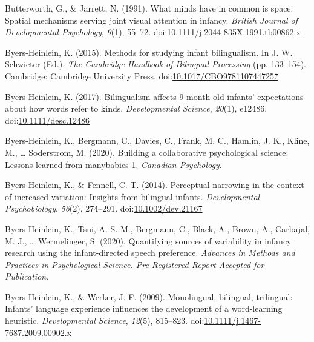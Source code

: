 \documentclass[,man,floatsintext]{apa6}
\begin{document}
\leavevmode\hypertarget{ref-Butterworth_Jarrett_1991}{}%
Butterworth, G., \& Jarrett, N. (1991). What minds have in common is space: Spatial mechanisms serving joint visual attention in infancy. \emph{British Journal of Developmental Psychology}, \emph{9}(1), 55--72. doi:\href{https://doi.org/10.1111/j.2044-835X.1991.tb00862.x}{10.1111/j.2044-835X.1991.tb00862.x}

\leavevmode\hypertarget{ref-Byers-Heinlein_2015}{}%
Byers-Heinlein, K. (2015). Methods for studying infant bilingualism. In J. W. Schwieter (Ed.), \emph{The Cambridge Handbook of Bilingual Processing} (pp. 133--154). Cambridge: Cambridge University Press. doi:\href{https://doi.org/10.1017/CBO9781107447257}{10.1017/CBO9781107447257}

\leavevmode\hypertarget{ref-Byers-Heinlein_2017}{}%
Byers-Heinlein, K. (2017). Bilingualism affects 9-month-old infants' expectations about how words refer to kinds. \emph{Developmental Science}, \emph{20}(1), e12486. doi:\href{https://doi.org/10.1111/desc.12486}{10.1111/desc.12486}

\leavevmode\hypertarget{ref-Byers-Heinlein_etal_2020a}{}%
Byers-Heinlein, K., Bergmann, C., Davies, C., Frank, M. C., Hamlin, J. K., Kline, M., \ldots{} Soderstrom, M. (2020). Building a collaborative psychological science: Lessons learned from manybabies 1. \emph{Canadian Psychology}.

\leavevmode\hypertarget{ref-Byers-Heinlein_Fennell_2014}{}%
Byers-Heinlein, K., \& Fennell, C. T. (2014). Perceptual narrowing in the context of increased variation: Insights from bilingual infants. \emph{Developmental Psychobiology}, \emph{56}(2), 274--291. doi:\href{https://doi.org/10.1002/dev.21167}{10.1002/dev.21167}

\leavevmode\hypertarget{ref-Byers-Heinlein_etal_2020b}{}%
Byers-Heinlein, K., Tsui, A. S. M., Bergmann, C., Black, A., Brown, A., Carbajal, M. J., \ldots{} Wermelinger, S. (2020). Quantifying sources of variability in infancy research using the infant-directed speech preference. \emph{Advances in Methods and Practices in Psychological Science. Pre-Registered Report Accepted for Publication}.

\leavevmode\hypertarget{ref-Byers-Heinlein_Werker_2009}{}%
Byers-Heinlein, K., \& Werker, J. F. (2009). Monolingual, bilingual, trilingual: Infants' language experience influences the development of a word-learning heuristic. \emph{Developmental Science}, \emph{12}(5), 815--823. doi:\href{https://doi.org/10.1111/j.1467-7687.2009.00902.x}{10.1111/j.1467-7687.2009.00902.x}
\end{document}
